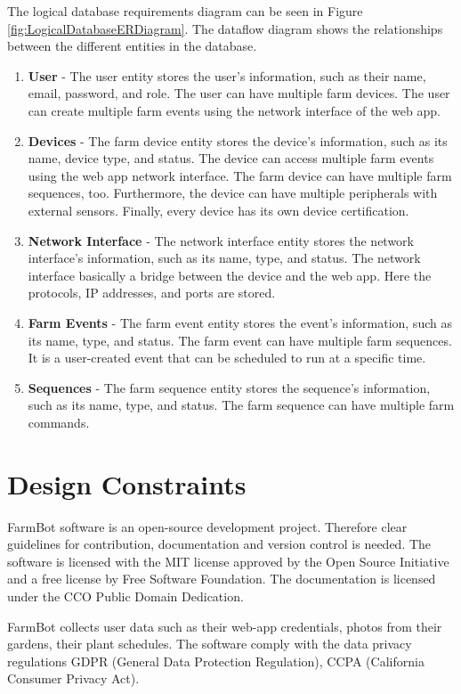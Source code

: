 The logical database requirements diagram can be seen in Figure \ref{fig:LogicalDatabaseERDiagram}. The dataflow diagram shows the relationships between the different entities in the database.
\begin{enumerate}
  \item \textbf{User} - The user entity stores the user's information, such as their name, email, password, and role. The user can have multiple farm devices. The user can create multiple farm events using the network interface of the web app.
  \item \textbf{Devices} - The farm device entity stores the device's information, such as its name, device type, and status. The device can access multiple farm events using the web app network interface. The farm device can have multiple farm sequences, too. Furthermore, the device can have multiple peripherals with external sensors. Finally, every device has its own device certification.
  \item \textbf{Network Interface} - The network interface entity stores the network interface's information, such as its name, type, and status. The network interface basically a bridge between the device and the web app. Here the protocols, IP addresses, and ports are stored.
  \item \textbf{Farm Events} - The farm event entity stores the event's information, such as its name, type, and status. The farm event can have multiple farm sequences. It is a user-created event that can be scheduled to run at a specific time.
  \item \textbf{Sequences} - The farm sequence entity stores the sequence's information, such as its name, type, and status. The farm sequence can have multiple farm commands.
\end{enumerate}

\section{Design Constraints}

FarmBot software is an open-source development project. Therefore clear guidelines for contribution, documentation and version control is needed. The software is licensed with the MIT license approved by the Open Source Initiative and a free license by Free Software Foundation. The documentation is licensed under the CCO Public Domain Dedication.

FarmBot collects user data such as their web-app credentials, photos from their gardens, their plant schedules. The software comply with the data privacy regulations GDPR (General Data Protection Regulation), CCPA (California Consumer Privacy Act).

